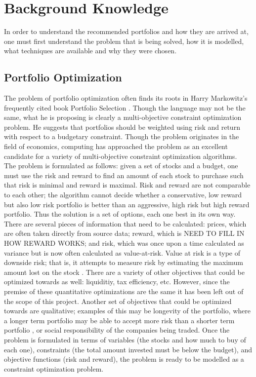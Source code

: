 \documentclass{article}
\begin{document}
    \section{Background Knowledge}
    In order to understand the recommended portfolios and how they are arrived at, one must first understand the problem that is being solved, how it is 
    modelled, what techniques are available and why they were chosen. 
    \subsection{Portfolio Optimization}
    The problem of portfolio optimization often finds its roots in Harry Markowitz's frequently cited book Portfolio Selection \cite{Markowitz}. Though
    the language may not be the same, what he is proposing is clearly a multi-objective constraint optimization problem. He suggests that portfolios
    should be weighted using risk and return with respect to a budgetary constraint. Though the problem originates in the field of 
    economics, computing has approached the problem as an excellent candidate for a variety of multi-objective constraint optimization algorithms. \\
    The problem is formulated as follows: given a set of stocks and a budget, one must use the risk and reward to find an amount of each stock to
    purchase such that risk is minimal and reward is maximal. Risk and reward are not comparable to each other; the algorithm cannot decide whether
    a conservative, low reward but also low risk portfolio is better than an aggressive, high risk but high reward portfolio. Thus the solution is a 
    set of options, each one best in its own way. There are several pieces of information that need to be calculated: prices, which are often taken 
    directly from source data; reward, which is NEED TO FILL IN HOW REWARD WORKS; and risk, which was once upon a time calculated as variance
    but is now often calculated as value-at-risk. Value at risk is a type of downside risk; that is, it attempts to measure risk by estimating the
    maximum amount lost on the stock \cite{HongHuZhang} \cite{Cid}. There are a variety of other objectives that could be optimized towards as well: 
    liquiditiy, tax efficiency, etc. However, since the premise of these quantitative optimizations are the same it has been left out of the scope 
    of this project. Another set of objectives that could be optimized towards are qualitative; examples of this may be longevity of the portfolio,
    where a longer term portfolio may be able to accept more risk than a shorter term portfolio \cite{Xiongetal}, or social responsibility of the 
    companies being traded. Once the problem is formulated in terms of variables (the stocks and how much to buy of each one), constraints (the 
    total amount invested must be below the budget), and objective functions (risk and reward), the problem is ready to be modelled as a constraint
    optimization problem.
\end{document}
